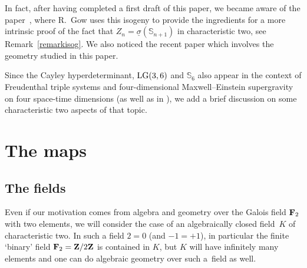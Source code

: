 \documentclass[10pt,a4paper]{amsart}
\newcommand{\ZZ}{{\bf Z}}
\newcommand{\FF}{{\bf F}}
\newcommand{\bS}{{\mathbb S}}
\numberwithin{equation}{section}
\begin{document}
In fact, after having completed a first draft of this paper, we became aware of the paper~\cite{Gow}, where R.~Gow uses this isogeny to provide the ingredients for a more intrinsic proof of the fact that $Z_n=\underline{\sigma}(\bS_{n+1})$ in characteristic two, see Remark~\ref{remarkisog}. We also noticed the recent paper \cite{LH} which involves the geometry studied in this paper.

Since the Cayley hyperdeterminant, ${\rm LG}(3,6)$ and $\bS_{6}$ also appear in the context of Freudenthal triple systems and four-dimensional Maxwell--Einstein supergravity on four space-time dimensions (as well as in \cite[Table~3]{Holweck}), we add a brief discussion on some characteristic two aspects of that topic.

\section{The maps}

\subsection{The fields}
Even if our motivation comes from algebra and geometry over the Galois field $\FF_2$ with two elements, we will consider the case of an algebraically closed field~$K$ of characteristic two. In such a field $2=0$ (and $-1=+1$), in particular the finite `binary' field $\FF_2=\ZZ/2\ZZ$ is contained in $K$, but $K$ will have infinitely many elements and one can do algebraic geometry over such a~field as well.
\end{document}
